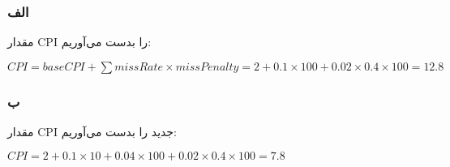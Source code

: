\subsubsection*{الف}

مقدار CPI را بدست می‌آوریم:

\setLTR
$
CPI = baseCPI + \sum missRate\times missPenalty = 2 + 0.1 \times 100 + 0.02 \times 0.4 \times 100 = 12.8
$
\setRTL

\subsubsection*{ب}
مقدار CPI جدید را بدست می‌آوریم:

\setLTR
$
CPI = 2 + 0.1 \times 10 + 0.04 \times 100 + 0.02 \times 0.4 \times 100 = 7.8
$
\setRTL